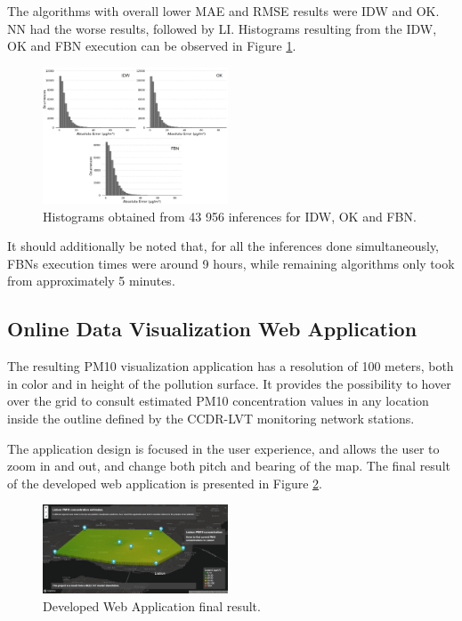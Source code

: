 The algorithms with overall lower MAE and RMSE results were IDW and OK. NN had the worse results, followed by LI. Histograms resulting from the IDW, OK and FBN execution can be observed in Figure \ref{fig:performance-histograms}.

\begin{figure}[ht]
\centering
\includegraphics[width=0.49\textwidth]{./Images/performance-histograms.jpg}
\caption{Histograms obtained from 43 956 inferences for IDW, OK and FBN.}
\label{fig:performance-histograms}
\end{figure}

It should additionally be noted that, for all the inferences done simultaneously, FBNs execution times were around 9 hours, while remaining algorithms only took from approximately 5 minutes.

\subsection{Online Data Visualization Web Application}

The resulting PM10 visualization application has a resolution of 100 meters, both in color and in height of the pollution surface. It provides the possibility to hover over the grid to consult estimated PM10 concentration values in any location inside the outline defined by the CCDR-LVT monitoring network stations.

The application design is focused in the user experience, and allows the user to zoom in and out, and change both pitch and bearing of the map. The final result of the developed web application is presented in Figure \ref{fig:developed-visualization}.

\begin{figure}[ht]
\centering
\includegraphics[width=0.49\textwidth]{./Images/developed-visualization.PNG}
\caption{Developed Web Application final result.}
\label{fig:developed-visualization}
\end{figure}

